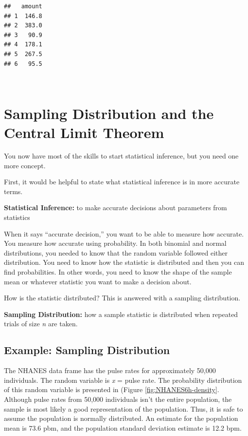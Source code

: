 \documentclass[
]{book}
\begin{document}
\begin{verbatim}
##   amount
## 1  146.8
## 2  383.0
## 3   90.9
## 4  178.1
## 5  267.5
## 6   95.5
\end{verbatim}

\textbf{\\
}

\hypertarget{sampling-distribution-and-the-central-limit-theorem}{%
\section{Sampling Distribution and the Central Limit Theorem}\label{sampling-distribution-and-the-central-limit-theorem}}

You now have most of the skills to start statistical inference, but you need one more concept.

First, it would be helpful to state what statistical inference is in more accurate terms.

\textbf{Statistical Inference:} to make accurate decisions about parameters from statistics

When it says ``accurate decision,'' you want to be able to measure how accurate. You measure how accurate using probability. In both binomial and normal distributions, you needed to know that the random variable followed either distribution. You need to know how the statistic is distributed and then you can find probabilities. In other words, you need to know the shape of the sample mean or whatever statistic you want to make a decision about.

How is the statistic distributed? This is answered with a sampling distribution.

\textbf{Sampling Distribution:} how a sample statistic is distributed when repeated trials of size \emph{n} are taken.

\hypertarget{example-sampling-distribution}{%
\subsection{Example: Sampling Distribution}\label{example-sampling-distribution}}

The NHANES data frame has the pulse rates for approximately 50,000 individuals. The random variable is \emph{x} = pulse rate. The probability distribution of this random variable is presented in (Figure \ref{fig:NHANES6h-density}. Although pulse rates from 50,000 individuals isn't the entire population, the sample is most likely a good representation of the population. Thus, it is safe to assume the population is normally distributed. An estimate for the population mean is 73.6 pbm, and the population standard deviation estimate is 12.2 bpm.
\end{document}

